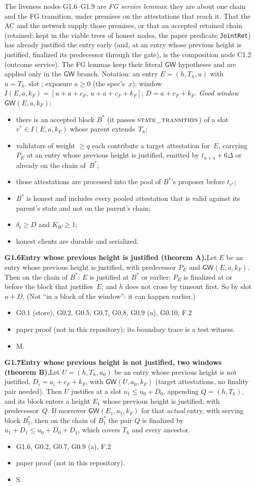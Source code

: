 \documentclass{article}
\newcommand{\slot}{\operatorname{slot}}
\newcommand{\fname}[1]{\text{\textsc{#1}}}
\newcommand{\cF}{c_F}
\newcommand{\dagnode}[6]{%
\par\medskip\noindent\textbf{#1\enspace #2.}\enspace #3
\begin{itemize}[leftmargin=2.2em,itemsep=0pt,topsep=2pt]
\item[\emph{Uses}] #4
\item[\emph{Evid.}] #5
\item[\emph{Task}] #6
\end{itemize}}
\begin{document}
The liveness nodes G1.6--G1.9 are \emph{FG service lemmas}: they are about
one chain and the FG transition, under premises on the attestations that reach it.
That the AC and the network supply those premises, or that an accepted
retained chain (retained: kept in the viable trees of honest nodes, the
paper predicate \texttt{JointRet}) has
already justified the entry early (and, at an entry whose previous height is justified,
finalized its predecessor through the gate), is the composition node C1.2
(outcome service).  The FG lemmas keep their literal $\mathsf{GW}$ hypotheses
and are applied only in the $\mathsf{GW}$ branch.  Notation: an entry $E=(h,T_h,u)$ with $u=T_h.\slot$;
exposure $a\geq0$ (the spec's~$x$); window $I(E,a,k_F)=[u+a+\cF,\,
u+a+\cF+k_F]$; $D=a+\cF+k_F$.  \emph{Good window} $\mathsf{GW}(E,a,k_F)$:
\begin{itemize}[itemsep=0pt,topsep=2pt]
\item[P1] there is an accepted block $B^*$ (it passes
  $\fname{state\_transition}$) of a slot $v^*\in I(E,a,k_F)$ whose parent
  extends~$T_h$;
\item[P2] validators of weight $\geq q$ each contribute a target attestation for~$E$,
  carrying~$P_E$ at an entry whose previous height is justified, emitted by $t_{u+a}+6\Delta$ or already
  on the chain of~$B^*$;
\item[P3--P4] those attestations are processed into the pool of $B^*$'s proposer
  before $t_{v^*}$;
\item[P5] $B^*$ is honest and includes every pooled attestation that is valid against
  its parent's state and not on the parent's chain;
\item[P6] $\delta_{\mathrm t}\geq D$ and $K_W\geq1$;
\item[P7] honest clients are durable and serialized.
\end{itemize}

\dagnode{G1.6}{Entry whose previous height is justified (theorem A)}{Let $E$ be an entry whose previous height is justified, with
predecessor $P_E$ and $\mathsf{GW}(E,a,k_F)$.  Then on the chain of $B^*$:
$E$ is justified at $B^*$ or earlier; $P_E$ is finalized at or before the
block that justifies~$E$; and $h$ does not cross by timeout first.  So by
slot $u+D$.  (Not ``in a block of the window'': it can happen earlier.)}
{G0.1 (store), G0.2, G0.5, G0.7, G0.8, G0.9 (a), G0.10, F.2}{paper proof (not in this repository); its boundary trace is a test
witness.}{M.}

\dagnode{G1.7}{Entry whose previous height is not justified, two windows (theorem B)}{Let $U=(h,T_h,u_0)$
be an entry whose previous height is not justified, $D_i=a_i+\cF+k_F$, with $\mathsf{GW}(U,a_0,k_F)$ (target attestations, no finality pair
needed).  Then $U$ justifies at a slot $u_1\leq u_0+D_0$, appending
$Q=(h,T_h)$, and its block enters a height $E_1$ whose previous height is justified, with predecessor~$Q$.
If moreover $\mathsf{GW}(E_1,a_1,k_F)$ for that \emph{actual} entry, with
serving block $B^*_1$, then on the chain of $B^*_1$ the pair $Q$ is finalized
by $u_1+D_1\leq u_0+D_0+D_1$, which covers $T_h$ and every ancestor.}
{G1.6, G0.2, G0.7, G0.9 (a), F.2}{paper proof (not in this repository).}{S.}
\end{document}
